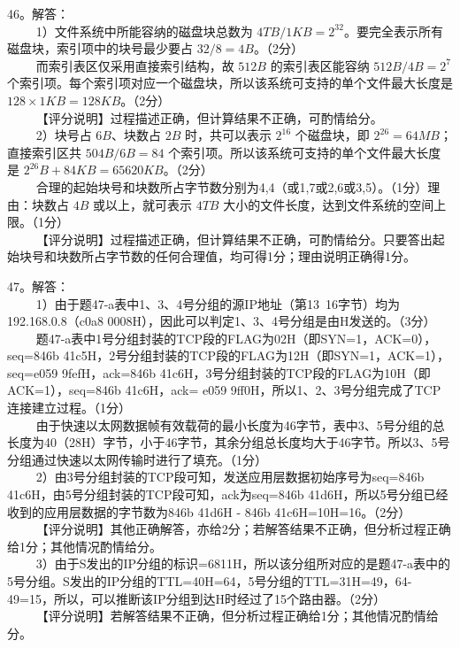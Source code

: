 46。解答： \\
$\qquad$ 1）文件系统中所能容纳的磁盘块总数为 $4TB/1KB=2^{32}$。要完全表示所有磁盘块，索引项中的块号最少要占 $32/8=4B$。（2分） \\
$\qquad$ 而索引表区仅采用直接索引结构，故 $512B$ 的索引表区能容纳 $512B/4B=2^7$ 个索引项。每个索引项对应一个磁盘块，所以该系统可支持的单个文件最大长度是 $128\times1KB=128KB$。（2分） \\
$\qquad$ 【评分说明】过程描述正确，但计算结果不正确，可酌情给分。 \\
$\qquad$ 2）块号占 $6B$、块数占 $2B$ 时，共可以表示 $2^{16}$ 个磁盘块，即 $2^{26}=64MB$；直接索引区共 $504B/6B=84$ 个索引项。所以该系统可支持的单个文件最大长度是 $2^{26}B+84KB=65620KB$。（2分） \\
$\qquad$ 合理的起始块号和块数所占字节数分别为4,4（或1,7或2,6或3,5）。（1分）理由：块数占 $4B$ 或以上，就可表示 $4TB$ 大小的文件长度，达到文件系统的空间上限。（1分） \\
$\qquad$ 【评分说明】过程描述正确，但计算结果不正确，可酌情给分。只要答出起始块号和块数所占字节数的任何合理值，均可得1分；理由说明正确得1分。

47。解答： \\
$\qquad$ 1）由于题47-a表中1、3、4号分组的源IP地址（第13~16字节）均为192.168.0.8（c0a8 0008H），因此可以判定1、3、4号分组是由H发送的。（3分） \\
$\qquad$ 题47-a表中1号分组封装的TCP段的FLAG为02H（即SYN=1，ACK=0），seq=846b 41c5H，2号分组封装的TCP段的FLAG为12H（即SYN=1，ACK=1），seq=e059 9fefH，ack=846b 41c6H，3号分组封装的TCP段的FLAG为10H（即ACK=1），seq=846b 41c6H，ack= e059 9ff0H，所以1、2、3号分组完成了TCP连接建立过程。（1分） \\
$\qquad$ 由于快速以太网数据帧有效载荷的最小长度为46字节，表中3、5号分组的总长度为40（28H）字节，小于46字节，其余分组总长度均大于46字节。所以3、5号分组通过快速以太网传输时进行了填充。（1分） \\
$\qquad$ 2）由3号分组封装的TCP段可知，发送应用层数据初始序号为seq=846b 41c6H，由5号分组封装的TCP段可知，ack为seq=846b 41d6H，所以5号分组已经收到的应用层数据的字节数为846b 41d6H - 846b 41c6H=10H=16。（2分） \\
$\qquad$ 【评分说明】其他正确解答，亦给2分；若解答结果不正确，但分析过程正确给1分；其他情况酌情给分。 \\
$\qquad$ 3）由于S发出的IP分组的标识=6811H，所以该分组所对应的是题47-a表中的5号分组。S发出的IP分组的TTL=40H=64，5号分组的TTL=31H=49，64-49=15，所以，可以推断该IP分组到达H时经过了15个路由器。（2分） \\
$\qquad$ 【评分说明】若解答结果不正确，但分析过程正确给1分；其他情况酌情给分。